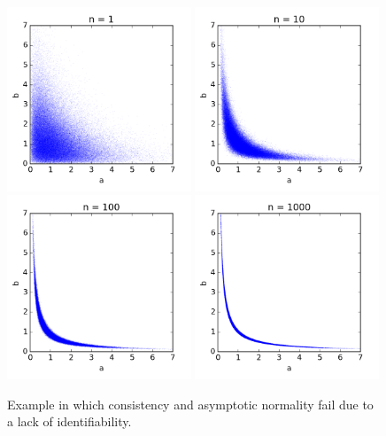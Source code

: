 \documentclass[12pt]{article}
\begin{document}
\begin{figure}
\begin{center}
\includegraphics[trim=0 0 0 0, clip, width=0.49\textwidth]{code/ex2-n=1.png}
\includegraphics[trim=0 0 0 0, clip, width=0.49\textwidth]{code/ex2-n=10.png}\\
\includegraphics[trim=0 0 0 0, clip, width=0.49\textwidth]{code/ex2-n=100.png}
\includegraphics[trim=0 0 0 0, clip, width=0.49\textwidth]{code/ex2-n=1000.png}
\end{center}
\caption{Example in which consistency and asymptotic normality fail due to a lack of identifiability.}
\label{figure:counterexample}
\end{figure}
\end{document}
